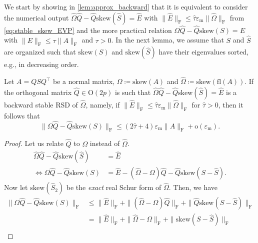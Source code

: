\documentclass[10pt,twoside,dvipsnames]{siamart1116}
\numberwithin{algorithm}{section}
\numberwithin{equation}{section}
\newcommand{\new}[1]{#1}
\begin{document}
\new{We start by showing in \cref{lem:approx_backward} that it is equivalent to consider the numerical output $\widehat{\Omega} \widehat{Q} -\widehat{Q}\mathrm{skew}(\widehat{S})=\widehat{E}$ with $ \|\widehat{E}\|_\mathrm{F}\leq \widehat{\tau}\varepsilon_\mathrm{m} \|\widehat{\Omega}\|_\mathrm{F}$ from \eqref{eq:stable_skew_EVP} and the more practical relation $\Omega \widehat{Q} -\widehat{Q}\mathrm{skew}(S)=E$ with $\|E\|_\mathrm{F}\leq\tau \|A\|_\mathrm{F}$ and $\tau>0$. In the next lemma, we assume that $S$ and $\widehat{S}$ are organized such that $\mathrm{skew}(S)$ and $\mathrm{skew}(\widehat{S})$ have their eigenvalues sorted, e.g., in decreasing order.
\begin{lemma}\label{lem:approx_backward}
Let $A=QSQ^\top$ be a normal matrix, $\Omega \coloneq\mathrm{skew}(A)$ and $\widehat{\Omega}\coloneq \mathrm{skew}(\mathrm{fl}(A))$.  If the orthogonal matrix $\widehat{Q}\in\mathrm{O}(2p)$ is such that $\widehat{\Omega}\widehat{Q}-\widehat{Q}\mathrm{skew}(\widehat{S})=\widehat{E}$ is a backward stable RSD of $\widehat{\Omega}$, namely, if $\|\widehat{E}\|_\mathrm{F}\leq \widehat{\tau} \varepsilon_\mathrm{m} \|\widehat{\Omega}\|_\mathrm{F}$ for $\widehat{\tau}>0$, then it follows that
\begin{equation*}
	\|\Omega \widehat{Q} - \widehat{Q}\mathrm{skew}(S)\|_\mathrm{F}\leq (2\widehat{\tau}+4)\varepsilon_\mathrm{m} \|A\|_\mathrm{F} + \mathrm{o}(\varepsilon_\mathrm{m}).
\end{equation*}
\end{lemma}
\begin{proof}
Let us relate $\widehat{Q}$ to $\Omega$ instead of $\widehat{\Omega}$.
\begin{align*}
	\widehat{\Omega} \widehat{Q} -\widehat{Q}\mathrm{skew}(\widehat{S})&=\widehat{E}\\
	\iff \Omega \widehat{Q} -\widehat{Q}\mathrm{skew
}(S) &= \widehat{E} - (\widehat{\Omega}-\Omega)\widehat{Q}-\widehat{Q}\mathrm{skew}(S-\widehat{S}).
\end{align*}
Now let $\mathrm{skew}(\widehat{S}_2)$ be the \emph{exact} real Schur form of $\widehat{\Omega}$. Then, we have
\begin{align*}
	\|\Omega \widehat{Q} -\widehat{Q}\mathrm{skew}(S)\|_\mathrm{F} &\leq \|\widehat{E}\|_\mathrm{F} + \|(\widehat{\Omega}-\Omega)\widehat{Q}\|_\mathrm{F}+\|\widehat{Q}\mathrm{skew}(S-\widehat{S})\|_\mathrm{F}\\
	&= \|\widehat{E}\|_\mathrm{F} + \|\widehat{\Omega}-\Omega\|_\mathrm{F}+\|\mathrm{skew}(S-\widehat{S})\|_\mathrm{F}\\

\end{align*}
\end{proof}}
\end{document}

